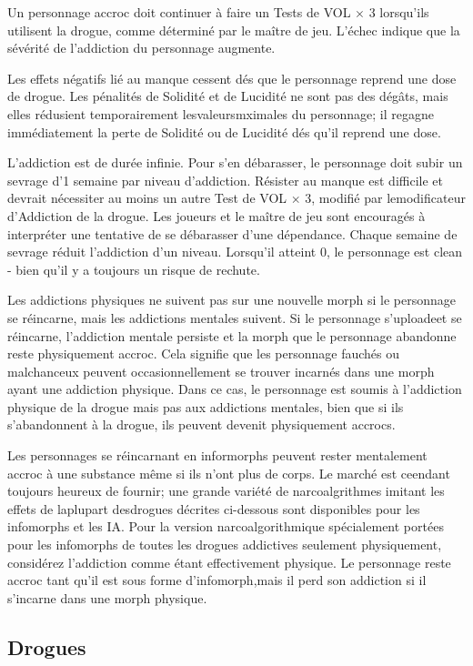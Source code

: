 Un personnage accroc doit continuer à faire un Tests de VOL $\times$ 3 lorsqu'ils utilisent la drogue, comme déterminé par le maître de jeu. L'échec indique que la sévérité de l'addiction du personnage augmente. 

Les effets négatifs lié au manque cessent dés que le personnage reprend une dose de drogue. Les pénalités de Solidité et de Lucidité ne sont pas des dégâts, mais elles rédusient temporairement lesvaleursmximales du personnage; il regagne immédiatement la perte de Solidité ou de Lucidité dés qu'il reprend une dose. 

L'addiction est de durée infinie. Pour s'en débarasser, le personnage doit subir un sevrage d'1 semaine par niveau d'addiction. Résister au manque est difficile et devrait nécessiter au moins un autre Test de VOL $\times$ 3, modifié par lemodificateur d'Addiction de la drogue. Les joueurs et le maître de jeu sont encouragés à interpréter une tentative de se débarasser d'une dépendance. Chaque semaine de sevrage réduit l'addiction d'un niveau. Lorsqu'il atteint 0, le personnage est clean - bien qu'il y a toujours un risque de rechute. 

Les addictions physiques ne suivent pas sur une nouvelle morph si le personnage se réincarne, mais les addictions mentales suivent. Si le personnage s'uploadeet se réincarne, l'addiction mentale persiste et la morph que le personnage abandonne reste physiquement accroc. Cela signifie que les personnage fauchés ou malchanceux peuvent occasionnellement se trouver incarnés dans une morph ayant une addiction physique. Dans ce cas, le personnage est soumis à l'addiction physique de la drogue mais pas aux addictions mentales, bien que si ils s'abandonnent à la drogue, ils peuvent devenit physiquement accrocs. 

Les personnages se réincarnant en informorphs peuvent rester mentalement accroc à une substance même si ils n'ont plus de corps. Le marché est ceendant toujours heureux de fournir; une grande variété de narcoalgrithmes imitant les effets de laplupart desdrogues décrites ci-dessous sont disponibles pour les infomorphs et les IA. Pour la version narcoalgorithmique spécialement portées pour les infomorphs de toutes les drogues addictives seulement physiquement, considérez l'addiction comme étant effectivement physique. Le personnage reste accroc tant qu'il est sous forme d'infomorph,mais il perd son addiction si il s'incarne dans une morph physique. 

\subsection{Drogues} \label{sec:drugs} 

